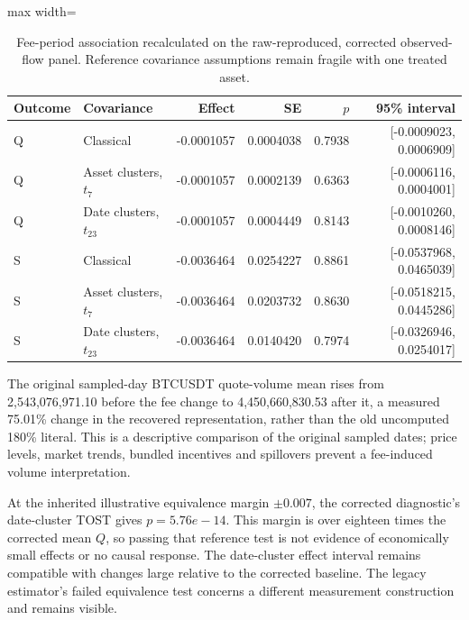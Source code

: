 \begin{table}[htbp]
\centering\small
\caption{Fee-period association recalculated on the raw-reproduced, corrected observed-flow panel. Reference covariance assumptions remain fragile with one treated asset.}\label{tab:restored_panel_fee}
\begin{adjustbox}{max width=\textwidth}
\begin{tabular}{llrrrr}\toprule
Outcome & Covariance & Effect & SE & $p$ & 95\% interval\\\midrule
Q & Classical & -0.0001057 & 0.0004038 & 0.7938 & [-0.0009023, 0.0006909]\\
Q & Asset clusters, $t_7$ & -0.0001057 & 0.0002139 & 0.6363 & [-0.0006116, 0.0004001]\\
Q & Date clusters, $t_{23}$ & -0.0001057 & 0.0004449 & 0.8143 & [-0.0010260, 0.0008146]\\
S & Classical & -0.0036464 & 0.0254227 & 0.8861 & [-0.0537968, 0.0465039]\\
S & Asset clusters, $t_7$ & -0.0036464 & 0.0203732 & 0.8630 & [-0.0518215, 0.0445286]\\
S & Date clusters, $t_{23}$ & -0.0036464 & 0.0140420 & 0.7974 & [-0.0326946, 0.0254017]\\
\bottomrule\end{tabular}
\end{adjustbox}
\end{table}
The original sampled-day BTCUSDT quote-volume mean rises from 2,543,076,971.10 before the fee change to 4,450,660,830.53 after it, a measured 75.01\% change in the recovered representation, rather than the old uncomputed 180\% literal. This is a descriptive comparison of the original sampled dates; price levels, market trends, bundled incentives and spillovers prevent a fee-induced volume interpretation.

At the inherited illustrative equivalence margin $\pm0.007$, the corrected diagnostic's date-cluster TOST gives $p=5.76e-14$. This margin is over eighteen times the corrected mean $Q$, so passing that reference test is not evidence of economically small effects or no causal response. The date-cluster effect interval remains compatible with changes large relative to the corrected baseline. The legacy estimator's failed equivalence test concerns a different measurement construction and remains visible.
